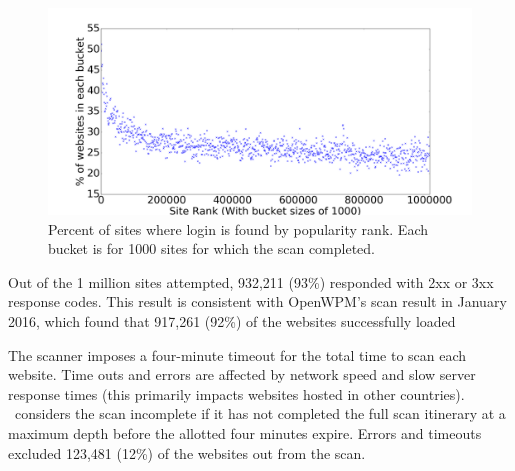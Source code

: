 \begin{figure}[bt]
\centering
\includegraphics[width=\linewidth]{percent_login_found.pdf}
\caption{Percent of sites where login is found by popularity rank. {\rm Each bucket is for 1000 sites for which the scan completed.}}
\label{percent_login_found}
\end{figure}

 Out of the 1 million sites attempted, 932,211 (93\%) responded with 2xx or 3xx response codes. This result is consistent with OpenWPM's scan result in January 2016, which found that 917,261 (92\%) of the websites successfully loaded~\cite{englehardt2016census} 

The scanner imposes a four-minute timeout for the total time to scan each website. Time outs and errors are affected by network speed and slow server response times (this primarily impacts websites hosted in other countries). \SwapScan\ considers the scan incomplete if it has not completed the full scan itinerary at a maximum depth before the allotted four minutes expire. Errors and timeouts excluded 123,481 (12\%) of the websites out from the scan. 




